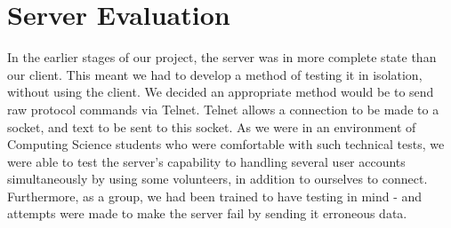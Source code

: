 \section{Server Evaluation}
\label{server_eval}

In the earlier stages of our project, the server was in more complete state than our client. This meant we had to develop a method of testing it in isolation, without using the client. We decided an appropriate method would be to send raw protocol commands via Telnet. Telnet allows a connection to be made to a socket, and text to be sent to this socket. As we were in an environment of Computing Science students who were comfortable with such technical tests, we were able to test the server's capability to handling several user accounts simultaneously by using some volunteers, in addition to ourselves to connect. Furthermore, as a group, we had been trained to have testing in mind - and attempts were made to make the server fail by sending it erroneous data. 

